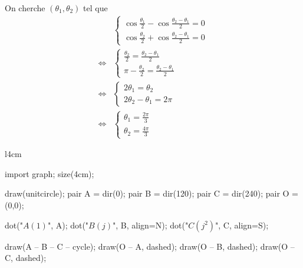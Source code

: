On cherche $(\theta_1, \theta_2)$ tel que
\begin{align*}
	&\begin{cases}
		\cos \frac{\theta_1}{2} - \cos\frac{\theta_2 - \theta_1}{2} = 0\\
		\cos \frac{\theta_2}{2} + \cos \frac{\theta_2- \theta_1}{2 } = 0
	\end{cases}\\
	\iff& \begin{cases}
		\frac{\theta_2}{2} = \frac{\theta_2 - \theta_1}{2}\\
		\pi - \frac{\theta_2}{2} = \frac{\theta_2 - \theta_1}{2}
	\end{cases}\\
	\iff& \begin{cases}
		2\theta_1 = \theta_2\\
		2\theta_2 - \theta_1 = 2\pi
	\end{cases}\\
	\iff& \begin{cases}
		\theta_1 = \frac{2\pi}{3}\\
		\theta_2 = \frac{4\pi}{3}
	\end{cases}
\end{align*}


\begin{wrapfigure}{l}{4cm}
	\centering
	\begin{asy}
		import graph;
		size(4cm);

		draw(unitcircle);
		pair A = dir(0);
		pair B = dir(120);
		pair C = dir(240);
		pair O = (0,0);

		dot("$A(1)$", A); dot("$B(j)$", B, align=N); dot("$C(j^2)$", C, align=S);

		draw(A -- B -- C -- cycle);
		draw(O -- A, dashed);
		draw(O -- B, dashed);
		draw(O -- C, dashed);
	\end{asy}
\end{wrapfigure}







